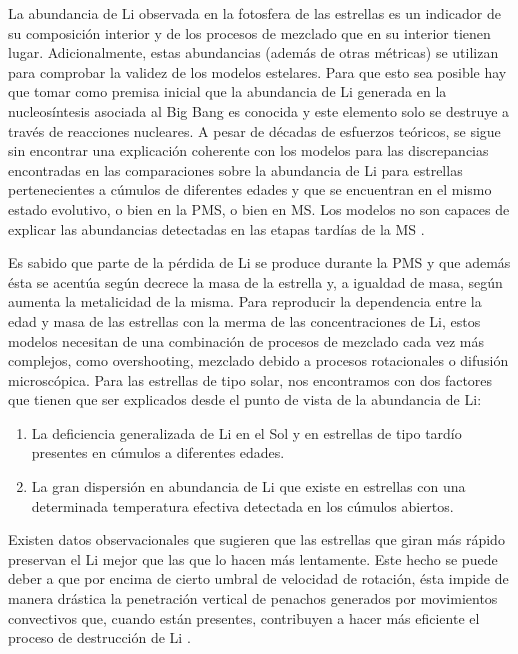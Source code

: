 La abundancia de Li observada en la fotosfera de las estrellas es un indicador de su composición interior y de los procesos de mezclado que en su interior tienen lugar. Adicionalmente, estas abundancias (además de otras métricas) se utilizan para comprobar la validez de los modelos estelares. Para que esto sea posible hay que tomar como premisa inicial que la abundancia de Li generada en la nucleosíntesis asociada al Big Bang es conocida y este elemento solo se destruye a través de reacciones nucleares. A pesar de décadas de esfuerzos teóricos, se sigue sin encontrar una explicación coherente con los modelos para las discrepancias encontradas en las comparaciones sobre la abundancia de Li para estrellas pertenecientes a cúmulos de diferentes edades y que se encuentran en el mismo estado evolutivo, o bien en la PMS, o bien en MS. Los modelos no son capaces de explicar las abundancias detectadas en las etapas tardías de la MS \cite{Tschape2001}.\par

Es sabido que parte de la pérdida de Li se produce durante la PMS y que además ésta se acentúa según decrece la masa de la estrella y, a igualdad de masa, según aumenta la metalicidad de la misma. Para reproducir la dependencia entre la edad y masa de las estrellas con la merma de las concentraciones de Li, estos modelos necesitan de una combinación de procesos de mezclado cada vez más complejos, como overshooting, mezclado debido a procesos rotacionales o difusión microscópica.
Para las estrellas de tipo solar, nos encontramos con dos factores que tienen que ser explicados desde el punto de vista de la abundancia de Li:

\begin{enumerate}
    \item La deficiencia generalizada de Li en el Sol y en estrellas de tipo tardío presentes en cúmulos a diferentes edades.
    \item La gran dispersión en abundancia de Li que existe en estrellas con una determinada temperatura efectiva detectada en los cúmulos abiertos.
\end{enumerate}

Existen datos observacionales que sugieren que las estrellas que giran más rápido preservan el Li mejor que las que lo hacen más lentamente. Este hecho se puede deber a que por encima de cierto umbral de velocidad de rotación, ésta impide de manera drástica la penetración vertical de penachos generados por movimientos convectivos que, cuando están presentes, contribuyen a hacer más eficiente el proceso de destrucción de Li \cite{Baraffe2017}.\par

